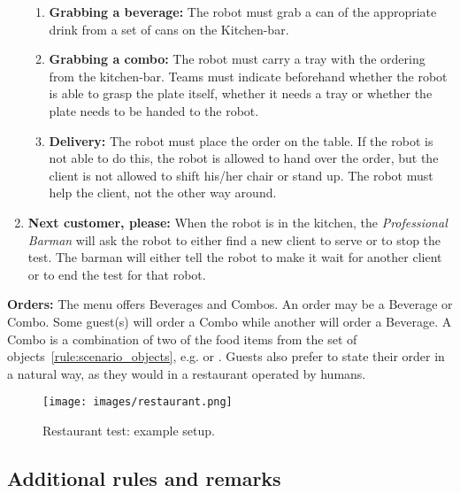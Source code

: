 \begin{enumerate}
\begin{enumerate}
		\item \textbf{Grabbing a beverage:} The robot must grab a can of the appropriate drink from a set of cans on the Kitchen-bar.

		\item \textbf{Grabbing a combo:}  The robot must carry a tray with the ordering from the kitchen-bar.
		Teams must indicate beforehand whether the robot is able to grasp the plate itself, whether it needs a tray or whether the plate needs to be handed to the robot.

		\item \textbf{Delivery:} The robot must place the order on the table.
		If the robot is not able to do this, the robot is allowed to hand over the order, but the client is not allowed to shift his/her chair or stand up.
		The robot must help the client, not the other way around.
	\end{enumerate}

	\item \textbf{Next customer, please:} When the robot is in the kitchen, the \textit{Professional Barman} will ask the robot to either find a new client to serve or to stop the test.
	The barman will either tell the robot  to make it wait for another client or  to end the test for that robot.
\end{enumerate}

\textbf{Orders:} The menu offers Beverages and Combos. An order may be a Beverage or Combo. Some guest(s) will order a Combo while another will order a Beverage.
  A Combo is a combination of two of the food items from the set of objects~\ref{rule:scenario_objects}, e.g.  or .
  Guests also prefer to state their order in a natural way, as they would in a restaurant operated by humans.

\begin{figure}[tbp]
	\centering
	\texttt{[image: images/restaurant.png]}
	\caption{Restaurant test: example setup.}
	\label{fig:restaurant}
\end{figure}

\subsection{Additional rules and remarks}

